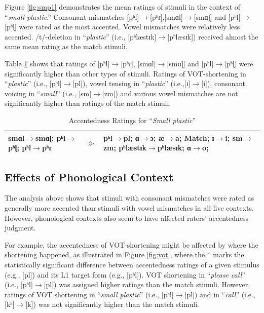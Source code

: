 Figure \ref{fig:smp1} demonstrates the mean ratings of stimuli in the context of “\textit{small plastic}.” Consonant mismatches [pʰl]$\rightarrow$[pʰɾ],[smɑl]$\rightarrow$[smɑɭ] and [pʰl]$\rightarrow$[pʰɭ] were rated as the most accented. Vowel mismatches were relatively less accented. /t/-deletion in “\textit{plastic}” (i.e., [pʰlæstɪk]$\rightarrow$[pʰlæsɪk]) received almost the same mean rating as the match stimuli. 

Table \ref{table:smp1} shows that ratings of [pʰl]$\rightarrow$[pʰɾ], [smɑl]$\rightarrow$[smɑɭ] and [pʰl]$\rightarrow$[pʰɭ] were significantly higher than other types of stimuli. Ratings of VOT-shortening in “\textit{plastic}” (i.e., [pʰl]$\rightarrow$[pl]), vowel tensing in “\textit{plastic}”  (i.e.,[ɪ]$\rightarrow$[i]), consonant voicing in “\textit{small}” (i.e., [sm]$\rightarrow$[zm]) and various vowel mismatches are not significantly higher than ratings of the match stimuli. 

\begin{table}[!h]
  \figSpace
  \centering
  \caption{Accentedness Ratings for “\textit{Small plastic}” }
  \label{table:smp1}%
    \begin{tabular}{lcp{40mm}}
    \toprule
  smɑl$\rightarrow$smɑɭ; pʰl$\rightarrow$pʰɭ; pʰl$\rightarrow$pʰɾ   &$\gg$ & pʰl$\rightarrow$pl; ɑ$\rightarrow$ɔ; æ$\rightarrow$a; 
  Match; ɪ$\rightarrow$i; sm$\rightarrow$zm; pʰlæstɪk$\rightarrow$pʰlæsɪk; ɑ$\rightarrow$o; \\
    \bottomrule
    \end{tabular}%
    \figSpace
\end{table}%

\subsection{Effects of Phonological Context}

The analysis above shows that stimuli with consonant mismatches were rated as generally more accented than stimuli with vowel mismatches in all five contexts. However, phonological contexts also seem to have affected raters' accentedness judgment. 

For example, the accentedness of VOT-shortening might be affected by where the shortening happened, as illustrated in Figure \ref{fig:vot}, where the \** marks the statistically significant difference between accentedness ratings of a given stimulus (e.g., [pl]) and its L1 target form (e.g., [pʰl]). VOT shortening in “\textit{please call}” (i.e., [pʰl]$\rightarrow$[pl]) was assigned higher ratings than the match stimuli. However, ratings of VOT shortening in “\textit{small plastic}” (i.e., [pʰl]$\rightarrow$[pl]) and in “\textit{call}” (i.e., [kʰ]$\rightarrow$[k]) was not significantly higher than the match stimuli.

